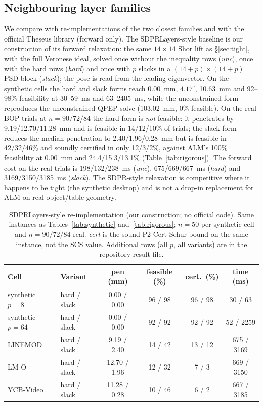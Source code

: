 \subsection{Neighbouring layer families}\label{sec:neigh}
We compare with re-implementations of the two closest families and with the official Theseus library (forward only). The SDPRLayers-style baseline \cite{holmes2025sdpr} is our construction of its forward relaxation: the same $14\times14$ Shor lift as \S\ref{sec:tight}, with the full Veronese ideal, solved once without the inequality rows (\emph{unc}), once with the hard rows (\emph{hard}) and once with $p$ slacks in a $(14+p)\times(14+p)$ PSD block (\emph{slack}); the pose is read from the leading eigenvector. On the synthetic cells the hard and slack forms reach 0.00~mm, $4.17^\circ$, 10.63~mm and 92--98\% feasibility at 30--59~ms and 63--2405~ms, while the unconstrained form reproduces the unconstrained QPEP solve (103.02~mm, 0\% feasible). On the real BOP trials at $n=90/72/84$ the hard form is \emph{not} feasible: it penetrates by 9.19/12.70/11.28~mm and is feasible in 14/12/10\% of trials; the slack form reduces the median penetration to 2.40/1.96/0.28~mm but is feasible in 42/32/46\% and soundly certified in only 12/3/2\%, against ALM's 100\% feasibility at 0.00~mm and 24.4/15.3/13.1\% (Table~\ref{tab:rigorous}). The forward cost on the real trials is 198/132/238~ms (\emph{unc}), 675/669/667~ms (\emph{hard}) and 3169/3150/3185~ms (\emph{slack}). The SDPR-style relaxation is competitive where it happens to be tight (the synthetic desktop) and is not a drop-in replacement for ALM on real object/table geometry.

\begin{table}[t]
\centering
\caption{SDPRLayers-style re-implementation (our construction; no official code). Same instances as Tables~\ref{tab:synthetic} and~\ref{tab:rigorous}; $n=50$ per synthetic cell and $n=90/72/84$ real. \emph{cert} is the sound P2-Cert Schur bound on the same instance, not the SCS value. Additional rows (all $p$, all variants) are in the repository result file.}
\label{tab:sdpr}
\scriptsize
\setlength{\tabcolsep}{3pt}
\begin{tabular}{@{}llcccc@{}}
\toprule
Cell & Variant & pen (mm) & feasible (\%) & cert.\ (\%) & time (ms) \\
\midrule
synthetic $p{=}8$ & hard / slack & 0.00 / 0.00 & 96 / 98 & 96 / 98 & 30 / 63 \\
synthetic $p{=}64$ & hard / slack & 0.00 / 0.00 & 92 / 92 & 92 / 92 & 52 / 2259 \\
LINEMOD & hard / slack & 9.19 / 2.40 & 14 / 42 & 13 / 12 & 675 / 3169 \\
LM-O & hard / slack & 12.70 / 1.96 & 12 / 32 & 7 / 3 & 669 / 3150 \\
YCB-Video & hard / slack & 11.28 / 0.28 & 10 / 46 & 6 / 2 & 667 / 3185 \\
\bottomrule
\end{tabular}
\end{table}

